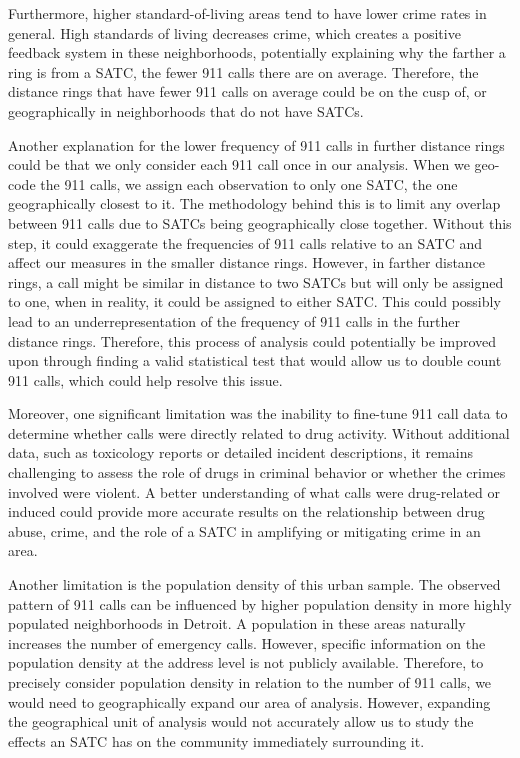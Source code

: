 \documentclass[12pt]{article}
\begin{document}
Furthermore, higher standard-of-living areas tend to have lower crime rates in general. High standards of living decreases crime, which creates a positive feedback system in these neighborhoods, potentially explaining why the farther a ring is from a SATC, the fewer 911 calls there are on average. Therefore, the distance rings that have fewer 911 calls on average could be on the cusp of, or geographically in neighborhoods that do not have SATCs. 
    
Another explanation for the lower frequency of 911 calls in further distance rings could be that we only consider each 911 call once in our analysis. When we geo-code the 911 calls, we assign each observation to only one SATC, the one geographically closest to it. The methodology behind this is to limit any overlap between 911 calls due to SATCs being geographically close together. Without this step, it could exaggerate the frequencies of 911 calls relative to an SATC and affect our measures in the smaller distance rings.  However, in farther distance rings, a call might be similar in distance to two SATCs but will only be assigned to one, when in reality, it could be assigned to either SATC. This could possibly lead to an underrepresentation of the frequency of 911 calls in the further distance rings. Therefore, this process of analysis could potentially be improved upon through finding a valid statistical test that would allow us to double count 911 calls, which could help resolve this issue. 

Moreover, one significant limitation was the inability to fine-tune 911 call data to determine whether calls were directly related to drug activity. Without additional data, such as toxicology reports or detailed incident descriptions, it remains challenging to assess the role of drugs in criminal behavior or whether the crimes involved were violent. A better understanding of what calls were drug-related or induced could provide more accurate results on the relationship between drug abuse, crime, and the role of a SATC in amplifying or mitigating crime in an area. 
    
Another limitation is the population density of this urban sample. The observed pattern of 911 calls can be influenced by higher population density in more highly populated neighborhoods in Detroit. A population in these areas naturally increases the number of emergency calls. However, specific information on the population density at the address level is not publicly available. Therefore, to precisely consider population density in relation to the number of 911 calls, we would need to geographically expand our area of analysis. However, expanding the geographical unit of analysis would not accurately allow us to study the effects an SATC has on the community immediately surrounding it. 
\end{document}
